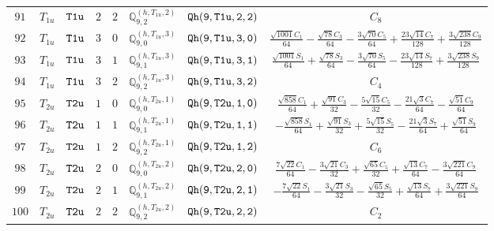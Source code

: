 \documentclass[fleqn,8pt]{jsarticle}
\begin{document}
\begin{table}[ht!]
\begin{center}
\begin{tabular}{cccccccc}
$ 91 $ & $ T_{1u} $ & $ {\tt T1u} $ & $ 2 $ & $ 2 $ & $ \mathbb{Q}_{9,2}^{(h,T_{1u},2)} $ & $ {\tt Qh(9,T1u,2,2)} $ & $ C_{8} $ \\
$ 92 $ & $ T_{1u} $ & $ {\tt T1u} $ & $ 3 $ & $ 0 $ & $ \mathbb{Q}_{9,0}^{(h,T_{1u},3)} $ & $ {\tt Qh(9,T1u,3,0)} $ & $ \frac{\sqrt{1001} C_{1}}{64} - \frac{\sqrt{78} C_{3}}{64} - \frac{3 \sqrt{70} C_{5}}{64} + \frac{23 \sqrt{14} C_{7}}{128} + \frac{3 \sqrt{238} C_{9}}{128} $ \\
$ 93 $ & $ T_{1u} $ & $ {\tt T1u} $ & $ 3 $ & $ 1 $ & $ \mathbb{Q}_{9,1}^{(h,T_{1u},3)} $ & $ {\tt Qh(9,T1u,3,1)} $ & $ \frac{\sqrt{1001} S_{1}}{64} + \frac{\sqrt{78} S_{3}}{64} - \frac{3 \sqrt{70} S_{5}}{64} - \frac{23 \sqrt{14} S_{7}}{128} + \frac{3 \sqrt{238} S_{9}}{128} $ \\
$ 94 $ & $ T_{1u} $ & $ {\tt T1u} $ & $ 3 $ & $ 2 $ & $ \mathbb{Q}_{9,2}^{(h,T_{1u},3)} $ & $ {\tt Qh(9,T1u,3,2)} $ & $ C_{4} $ \\
$ 95 $ & $ T_{2u} $ & $ {\tt T2u} $ & $ 1 $ & $ 0 $ & $ \mathbb{Q}_{9,0}^{(h,T_{2u},1)} $ & $ {\tt Qh(9,T2u,1,0)} $ & $ \frac{\sqrt{858} C_{1}}{64} + \frac{\sqrt{91} C_{3}}{32} - \frac{5 \sqrt{15} C_{5}}{32} - \frac{21 \sqrt{3} C_{7}}{64} - \frac{\sqrt{51} C_{9}}{64} $ \\
$ 96 $ & $ T_{2u} $ & $ {\tt T2u} $ & $ 1 $ & $ 1 $ & $ \mathbb{Q}_{9,1}^{(h,T_{2u},1)} $ & $ {\tt Qh(9,T2u,1,1)} $ & $ - \frac{\sqrt{858} S_{1}}{64} + \frac{\sqrt{91} S_{3}}{32} + \frac{5 \sqrt{15} S_{5}}{32} - \frac{21 \sqrt{3} S_{7}}{64} + \frac{\sqrt{51} S_{9}}{64} $ \\
$ 97 $ & $ T_{2u} $ & $ {\tt T2u} $ & $ 1 $ & $ 2 $ & $ \mathbb{Q}_{9,2}^{(h,T_{2u},1)} $ & $ {\tt Qh(9,T2u,1,2)} $ & $ C_{6} $ \\
$ 98 $ & $ T_{2u} $ & $ {\tt T2u} $ & $ 2 $ & $ 0 $ & $ \mathbb{Q}_{9,0}^{(h,T_{2u},2)} $ & $ {\tt Qh(9,T2u,2,0)} $ & $ \frac{7 \sqrt{22} C_{1}}{64} - \frac{3 \sqrt{21} C_{3}}{32} + \frac{\sqrt{65} C_{5}}{32} + \frac{\sqrt{13} C_{7}}{64} - \frac{3 \sqrt{221} C_{9}}{64} $ \\
$ 99 $ & $ T_{2u} $ & $ {\tt T2u} $ & $ 2 $ & $ 1 $ & $ \mathbb{Q}_{9,1}^{(h,T_{2u},2)} $ & $ {\tt Qh(9,T2u,2,1)} $ & $ - \frac{7 \sqrt{22} S_{1}}{64} - \frac{3 \sqrt{21} S_{3}}{32} - \frac{\sqrt{65} S_{5}}{32} + \frac{\sqrt{13} S_{7}}{64} + \frac{3 \sqrt{221} S_{9}}{64} $ \\
$ 100 $ & $ T_{2u} $ & $ {\tt T2u} $ & $ 2 $ & $ 2 $ & $ \mathbb{Q}_{9,2}^{(h,T_{2u},2)} $ & $ {\tt Qh(9,T2u,2,2)} $ & $ C_{2} $ \\
 \hline \hline
\end{tabular}
\end{center}
\end{table}
\end{document}
